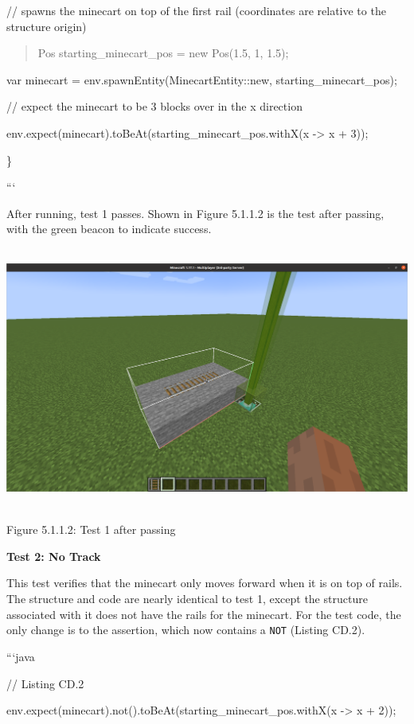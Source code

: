 \documentclass{article}
\def\code#1{\texttt{#1}}
\begin{document}
\begin{onehalfspacing}
// spawns the minecart on top of the first rail (coordinates are
relative to the structure origin)

\begin{quote}
Pos starting\_minecart\_pos = new Pos(1.5, 1, 1.5);
\end{quote}

var minecart = env.spawnEntity(MinecartEntity::new,
starting\_minecart\_pos);

// expect the minecart to be 3 blocks over in the x direction

env.expect(minecart).toBeAt(starting\_minecart\_pos.withX(x
-\textgreater{} x + 3));

\}

```

After running, test 1 passes. Shown in Figure 5.1.1.2 is the test after
passing, with the green beacon to indicate success.

\includegraphics[width=6.17708in,height=3.39355in]{media/media/image12.png}

Figure 5.1.1.2: Test 1 after passing

\textbf{Test 2: No Track}

This test verifies that the minecart only moves forward when it is on
top of rails. The structure and code are nearly identical to test 1,
except the structure associated with it does not have the rails for the
minecart. For the test code, the only change is to the assertion, which
now contains a \code{NOT} (Listing CD.2).

```java

// Listing CD.2

env.expect(minecart).not().toBeAt(starting\_minecart\_pos.withX(x
-\textgreater{} x + 2));


\end{onehalfspacing}
\end{document}
